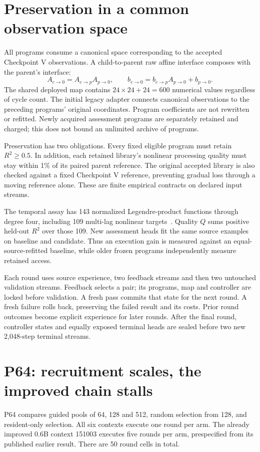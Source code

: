 \documentclass[11pt]{article}
\begin{document}
\section{Preservation in a common observation space}
All programs consume a canonical space corresponding to the accepted Checkpoint V observations. A child-to-parent raw affine interface composes with the parent's interface:
\begin{equation}
 A_{c\to0}=A_{c\to p}A_{p\to0},\qquad
 b_{c\to0}=b_{c\to p}A_{p\to0}+b_{p\to0}.
\end{equation}
The shared deployed map contains $24\times24+24=600$ numerical values regardless of cycle count. The initial legacy adapter connects canonical observations to the preceding programs' original coordinates. Program coefficients are not rewritten or refitted. Newly acquired assessment programs are separately retained and charged; this does not bound an unlimited archive of programs.

Preservation has two obligations. Every fixed eligible program must retain $R^2\geq0.5$. In addition, each retained library's nonlinear processing quality must stay within 1\% of its paired parent reference. The original accepted library is also checked against a fixed Checkpoint V reference, preventing gradual loss through a moving reference alone. These are finite empirical contracts on declared input streams.

The temporal assay has 143 normalized Legendre-product functions through degree four, including 109 multi-lag nonlinear targets~\cite{dambre}. Quality $Q$ sums positive held-out $R^2$ over those 109. New assessment heads fit the same source examples on baseline and candidate. Thus an execution gain is measured against an equal-source-refitted baseline, while older frozen programs independently measure retained access.

Each round uses source experience, two feedback streams and then two untouched validation streams. Feedback selects a pair; its programs, map and controller are locked before validation. A fresh pass commits that state for the next round. A fresh failure rolls back, preserving the failed result and its costs. Prior round outcomes become explicit experience for later rounds. After the final round, controller states and equally exposed terminal heads are sealed before two new 2,048-step terminal streams.

\section{P64: recruitment scales, the improved chain stalls}
P64 compares guided pools of 64, 128 and 512, random selection from 128, and resident-only selection. All six contexts execute one round per arm. The already improved 0.6B context 151003 executes five rounds per arm, prespecified from its published earlier result. There are 50 round cells in total.
\end{document}
